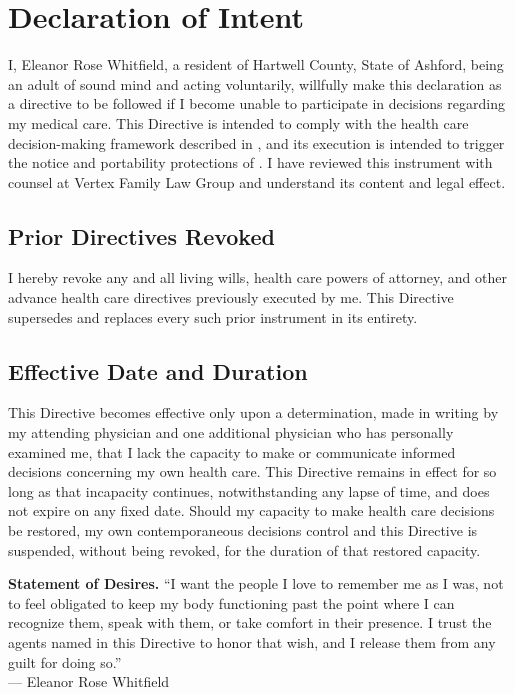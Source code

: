 \section{Declaration of Intent}
\label{sec:declaration}

I, Eleanor Rose Whitfield, a resident of Hartwell County, State of Ashford, being an adult of sound mind and acting voluntarily, willfully make this declaration as a directive to be followed if I become unable to participate in decisions regarding my medical care. This Directive is intended to comply with the health care decision-making framework described in \citet{uhcda1993}, and its execution is intended to trigger the notice and portability protections of \citet{psda1990}. I have reviewed this instrument with counsel at Vertex Family Law Group and understand its content and legal effect.

\subsection{Prior Directives Revoked}
I hereby revoke any and all living wills, health care powers of attorney, and other advance health care directives previously executed by me. This Directive supersedes and replaces every such prior instrument in its entirety.

\subsection{Effective Date and Duration}
\label{sec:effective}
This Directive becomes effective only upon a determination, made in writing by my attending physician and one additional physician who has personally examined me, that I lack the capacity to make or communicate informed decisions concerning my own health care. This Directive remains in effect for so long as that incapacity continues, notwithstanding any lapse of time, and does not expire on any fixed date. Should my capacity to make health care decisions be restored, my own contemporaneous decisions control and this Directive is suspended, without being revoked, for the duration of that restored capacity.

\begin{noticebox}
\textbf{Statement of Desires.} ``I want the people I love to remember me as I was, not to feel obligated to keep my body functioning past the point where I can recognize them, speak with them, or take comfort in their presence. I trust the agents named in this Directive to honor that wish, and I release them from any guilt for doing so.''\\[2pt]
\hfill --- Eleanor Rose Whitfield
\end{noticebox}

